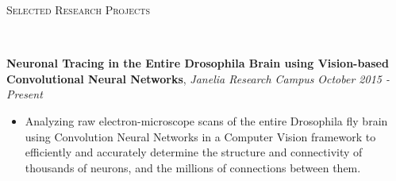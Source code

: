 \documentclass[9pt]{article}
\newenvironment{changemargin}[2]{%
  \begin{list}{}{%
    \setlength{\topsep}{0pt}%
    \setlength{\leftmargin}{#1}%
    \setlength{\rightmargin}{#2}%
    \setlength{\listparindent}{\parindent}%
    \setlength{\itemindent}{\parindent}%
    \setlength{\parsep}{\parskip}%
  }%
  \item[]}{\end{list}
}
\newcommand{\lineover}{
	\begin{changemargin}{-0.05in}{-0.05in}
		\vspace*{-8pt}
		\hrulefill \\
		\vspace*{-2pt}
	\end{changemargin}
}
\newcommand{\header}[1]{
	\begin{changemargin}{-0.5in}{-0.5in}
		\scshape{#1}\\
  	\lineover
	\end{changemargin}
}
\newenvironment{body} {
	\vspace*{-16pt}
	\begin{changemargin}{-0.25in}{-0.5in}
  }	
	{\end{changemargin}
}
\begin{document}



\header{Selected Research Projects}
\begin{body}
	\vspace{18pt}
	
	\textbf{Neuronal Tracing in the Entire Drosophila Brain using Vision-based Convolutional Neural Networks}, \emph{Janelia Research Campus} \hfill \emph{October 2015 - Present}
	\vspace*{-3pt}
	\begin{itemize} \itemsep -0pt
	\item Analyzing raw electron-microscope scans of the entire Drosophila fly brain using Convolution Neural Networks in a Computer Vision framework to efficiently and accurately determine the structure and connectivity of thousands of neurons, and the millions of connections between them.
	\end{itemize}
	

\end{body}
\end{document}
